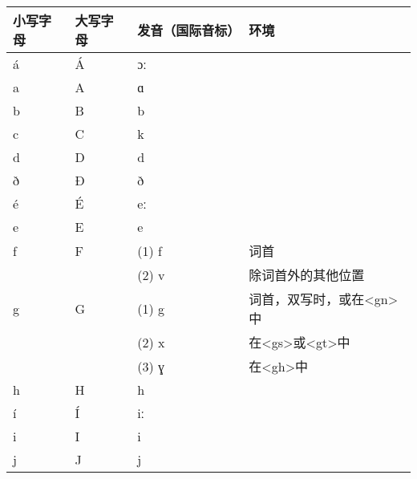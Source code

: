 \begin{longtable}{llll}
  \toprule
  小写字母 & 大写字母 & 发音（国际音标） & 环境                                                     \\
  \midrule
  \endhead
  \bottomrule
  \endfoot
  á        & Á        & ɔː               &                                                          \\
  a        & A        & ɑ                &                                                          \\
  b        & B        & b                &                                                          \\
  c        & C        & k                &                                                          \\
  d        & D        & d                &                                                          \\
  ð        & Ð        & ð                &                                                          \\
  é        & É        & eː               &                                                          \\
  e        & E        & e                &                                                          \\
  f        & F        & (1) f            & 词首                                                     \\
           &          & (2) v            & 除词首外的其他位置                                       \\
  g        & G        & (1) g            & 词首，双写时，或在\textless gn\textgreater 中            \\
           &          & (2) x            & 在\textless gs\textgreater 或\textless gt\textgreater 中 \\
           &          & (3) ɣ            & 在\textless gh\textgreater 中                            \\
  h        & H        & h                &                                                          \\
  í        & Í        & iː               &                                                          \\
  i        & I        & i                &                                                          \\
  j        & J        & j                &                                                          \\

\end{longtable}
